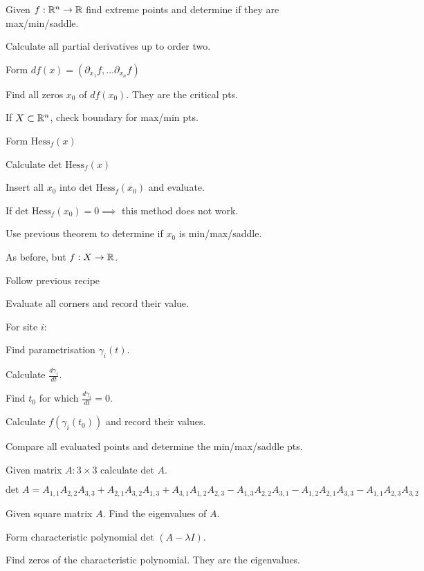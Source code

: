 Given $f: \mathbb{R}^n \to \mathbb{R}$ find extreme points and determine if they are max/min/saddle.
\begin{compactenum}
    \item Calculate all partial derivatives up to order two.
    \item Form $df(x) = (\partial_{x_1}f, \dots \partial_{x_n}f)$
    \item Find all zeros $x_0$ of $df(x_0)$. They are the critical pts.
    \item If $X \subset \mathbb{R}^n$, check boundary for max/min pts.
    \item Form $\text{Hess}_f (x)$
    \item Calculate $\text{det Hess}_f (x)$
    \item Insert all $x_0$ into $\text{det Hess}_f (x_0)$ and evaluate.
    \item If $\text{det Hess}_f (x_0) = 0 \implies$ this method does not work.
    \item Use previous theorem to determine if $x_0$ is min/max/saddle.
\end{compactenum}

As before, but $f: X \to \mathbb{R}$.

\begin{compactenum}
    \item Follow previous recipe
    \item Evaluate all corners and record their value.
    \item For site $i$:
        \begin{compactenum}
            \item Find parametrisation $\gamma_i(t)$.
            \item Calculate $\frac{d \gamma_i}{d t}$.
            \item Find $t_0$ for which $\frac{d \gamma_i}{d t} = 0$.
            \item Calculate $f(\gamma_i(t_0))$ and record their values.
        \end{compactenum}
    \item Compare all evaluated points and determine the min/max/saddle pts.
\end{compactenum}

Given matrix $A: 3 \times 3$ calculate $\text{det }A$.

$\text{det } A = A_{1, 1} A_{2, 2} A_{3, 3} + A_{2, 1} A_{3, 2} A_{1, 3} + A_{3, 1} A_{1, 2} A_{2, 3} - A_{1, 3} A_{2, 2} A_{3, 1} - A_{1, 2} A_{2, 1} A_{3, 3} - A_{1, 1} A_{2, 3} A_{3, 2}$

Given square matrix $A$. Find the eigenvalues of $A$.

\begin{compactenum}
    \item Form characteristic polynomial $\text{det } (A - \lambda I)$.
    \item Find zeros of the characteristic polynomial. They are the eigenvalues.
\end{compactenum}

